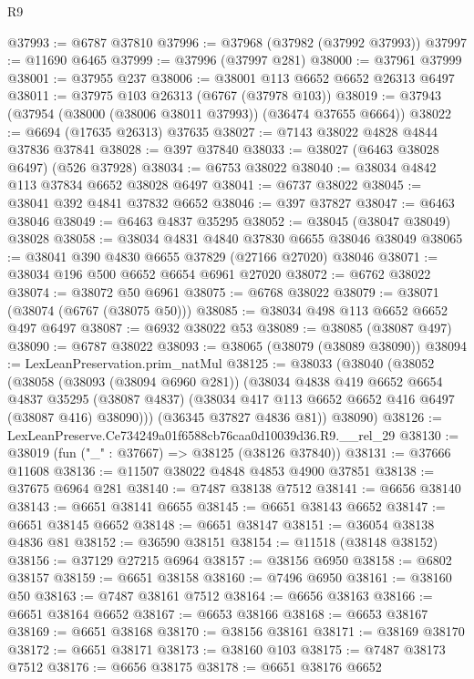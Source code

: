 \begin{lexlean}{R9}
\begin{coremodule}
@37993 := @6787 @37810
@37996 := @37968 (@37982 (@37992 @37993))
@37997 := @11690 @6465
@37999 := @37996 (@37997 @281)
@38000 := @37961 @37999
@38001 := @37955 @237
@38006 := @38001 @113 @6652 @6652 @26313 @6497
@38011 := @37975 @103 @26313 (@6767 (@37978 @103))
@38019 := @37943 (@37954 (@38000 (@38006 @38011 @37993)) (@36474 @37655 @6664))
@38022 := @6694 (@17635 @26313) @37635
@38027 := @7143 @38022 @4828 @4844 @37836 @37841
@38028 := @397 @37840
@38033 := @38027 (@6463 @38028 @6497) (@526 @37928)
@38034 := @6753 @38022
@38040 := @38034 @4842 @113 @37834 @6652 @38028 @6497
@38041 := @6737 @38022
@38045 := @38041 @392 @4841 @37832 @6652
@38046 := @397 @37827
@38047 := @6463 @38046
@38049 := @6463 @4837 @35295
@38052 := @38045 (@38047 @38049) @38028
@38058 := @38034 @4831 @4840 @37830 @6655 @38046 @38049
@38065 := @38041 @390 @4830 @6655 @37829 (@27166 @27020) @38046
@38071 := @38034 @196 @500 @6652 @6654 @6961 @27020
@38072 := @6762 @38022
@38074 := @38072 @50 @6961
@38075 := @6768 @38022
@38079 := @38071 (@38074 (@6767 (@38075 @50)))
@38085 := @38034 @498 @113 @6652 @6652 @497 @6497
@38087 := @6932 @38022 @53
@38089 := @38085 (@38087 @497)
@38090 := @6787 @38022
@38093 := @38065 (@38079 (@38089 @38090))
@38094 := LexLeanPreservation.prim_natMul
@38125 := @38033
    (@38040
      (@38052
        (@38058
          (@38093 (@38094 @6960 @281))
          (@38034
            @4838
            @419
            @6652
            @6654
            @4837
            @35295
            (@38087 @4837)
            (@38034 @417 @113 @6652 @6652 @416 @6497 (@38087 @416) @38090)))
        (@36345 @37827 @4836 @81))
      @38090)
@38126 := LexLeanPreserve.Ce734249a01f6588cb76caa0d10039d36.R9.__rel_29
@38130 := @38019 (fun ("_" : @37667) => @38125 (@38126 @37840))
@38131 := @37666 @11608
@38136 := @11507 @38022 @4848 @4853 @4900 @37851
@38138 := @37675 @6964 @281
@38140 := @7487 @38138 @7512
@38141 := @6656 @38140
@38143 := @6651 @38141 @6655
@38145 := @6651 @38143 @6652
@38147 := @6651 @38145 @6652
@38148 := @6651 @38147
@38151 := @36054 @38138 @4836 @81
@38152 := @36590 @38151
@38154 := @11518 (@38148 @38152)
@38156 := @37129 @27215 @6964
@38157 := @38156 @6950
@38158 := @6802 @38157
@38159 := @6651 @38158
@38160 := @7496 @6950
@38161 := @38160 @50
@38163 := @7487 @38161 @7512
@38164 := @6656 @38163
@38166 := @6651 @38164 @6652
@38167 := @6653 @38166
@38168 := @6653 @38167
@38169 := @6651 @38168
@38170 := @38156 @38161
@38171 := @38169 @38170
@38172 := @6651 @38171
@38173 := @38160 @103
@38175 := @7487 @38173 @7512
@38176 := @6656 @38175
@38178 := @6651 @38176 @6652

\end{coremodule}
\end{lexlean}
